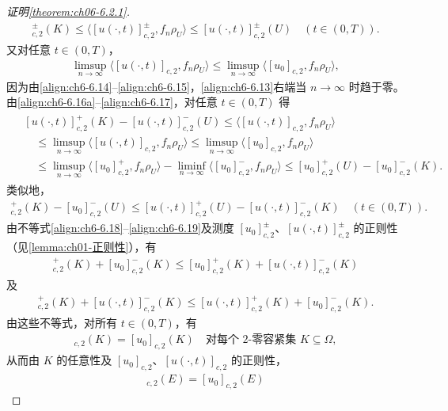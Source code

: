\documentclass[../../main.tex]{subfiles}%
\begin{document}
\begin{proof}[证明\cref{theorem:ch06-6.2.1}]
\begin{align}
[u(\cdot,t)]^\pm_{c,2}(K)\leqslant\langle[u(\cdot,t)]^\pm_{c,2},f_n\rho_U\rangle\leqslant[u(\cdot,t)]^\pm_{c,2}(U)
\quad(t\in(0,T)). \label{align:ch6-6.16b}
\end{align}
又对任意 $t\in(0,T)$，
\begin{align}
\limsup_{n\to\infty}\langle[u(\cdot,t)]_{c,2},f_n\rho_U\rangle
\leqslant\limsup_{n\to\infty}\langle[u_0]_{c,2},f_n\rho_U\rangle, \label{align:ch6-6.17}
\end{align}
因为由\eqref{align:ch6-6.14}--\eqref{align:ch6-6.15}，\eqref{align:ch6-6.13}右端当 $n\to\infty$ 时趋于零。由\eqref{align:ch6-6.16a}--\eqref{align:ch6-6.17}，对任意 $t\in(0,T)$ 得
\begin{align}
\begin{aligned}
&[u(\cdot,t)]^+_{c,2}(K)-[u(\cdot,t)]^-_{c,2}(U)
\leqslant\langle[u(\cdot,t)]_{c,2},f_n\rho_U\rangle\\
&\quad\leqslant\limsup_{n\to\infty}\langle[u(\cdot,t)]_{c,2},f_n\rho_U\rangle
\leqslant\limsup_{n\to\infty}\langle[u_0]_{c,2},f_n\rho_U\rangle\\
&\quad\leqslant\limsup_{n\to\infty}\langle[u_0]^+_{c,2},f_n\rho_U\rangle
-\liminf_{n\to\infty}\langle[u_0]^-_{c,2},f_n\rho_U\rangle
\leqslant[u_0]^+_{c,2}(U)-[u_0]^-_{c,2}(K).
\end{aligned} \label{align:ch6-6.18}
\end{align}
类似地，
\begin{align}
[u_0]^+_{c,2}(K)-[u_0]^-_{c,2}(U)
\leqslant[u(\cdot,t)]^+_{c,2}(U)-[u(\cdot,t)]^-_{c,2}(K)
\quad(t\in(0,T)). \label{align:ch6-6.19}
\end{align}
由不等式\eqref{align:ch6-6.18}--\eqref{align:ch6-6.19}及测度 $[u_0]^\pm_{c,2}$、$[u(\cdot,t)]^\pm_{c,2}$ 的正则性（见\cref{lemma:ch01-正则性}），有
\begin{align*}
[u(\cdot,t)]^+_{c,2}(K)+[u_0]^-_{c,2}(K)
\leqslant[u_0]^+_{c,2}(K)+[u(\cdot,t)]^-_{c,2}(K)
\end{align*}
及
\begin{align*}
[u_0]^+_{c,2}(K)+[u(\cdot,t)]^-_{c,2}(K)
\leqslant[u(\cdot,t)]^+_{c,2}(K)+[u_0]^-_{c,2}(K).
\end{align*}
由这些不等式，对所有 $t\in(0,T)$，有
\begin{align*}
[u(\cdot,t)]_{c,2}(K)=[u_0]_{c,2}(K)
\quad\text{对每个 }2\text{-零容紧集 }K\subseteq\Omega,
\end{align*}
从而由 $K$ 的任意性及 $[u_0]_{c,2}$、$[u(\cdot,t)]_{c,2}$ 的正则性，
\begin{align}
[u(\cdot,t)]_{c,2}(E)=[u_0]_{c,2}(E)

\end{align}
\end{proof}
\end{document}
